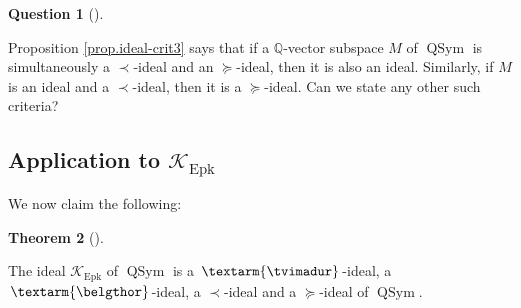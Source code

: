 \documentclass[numbers=enddot,12pt,final,onecolumn,notitlepage]{scrartcl}%
\theoremstyle{definition}
\newtheorem{theo}{Theorem}[section]
\newenvironment{theorem}[1][]
{\begin{theo}[#1]\begin{leftbar}}
{\end{leftbar}\end{theo}}
\newtheorem{quest}[theo]{Question}
\newenvironment{question}[1][]
{\begin{quest}[#1]\begin{leftbar}}
{\end{leftbar}\end{quest}}
\newenvironment{question}[1][Question]{\noindent\textbf{#1.} }{\ \rule{0.5em}{0.5em}}
\newcommand{\tvi}{\left. \textarm{\tvimadur} \right.}
\newcommand{\bel}{\left. \textarm{\belgthor} \right.}
\begin{document}
\begin{question}
Proposition \ref{prop.ideal-crit3} says that if a $\mathbb{Q}$-vector subspace
$M$ of $\operatorname*{QSym}$ is simultaneously a $\left.  \prec\right.
$-ideal and an $\left.  \succeq\right.  $-ideal, then it is also an ideal.
Similarly, if $M$ is an ideal and a $\left.  \prec\right.  $-ideal, then it is
a $\left.  \succeq\right.  $-ideal. Can we state any other such criteria?
\end{question}

\subsection{Application to $\mathcal{K}_{\operatorname*{Epk}}$}

We now claim the following:

\begin{theorem}
\label{thm.Epk.dend}The ideal $\mathcal{K}_{\operatorname*{Epk}}$ of
$\operatorname*{QSym}$ is a $\tvi  $-ideal, a $\bel  $-ideal, a $\left.
\prec\right.  $-ideal and a $\left.  \succeq\right.  $-ideal of
$\operatorname*{QSym}$.
\end{theorem}
\end{document}
